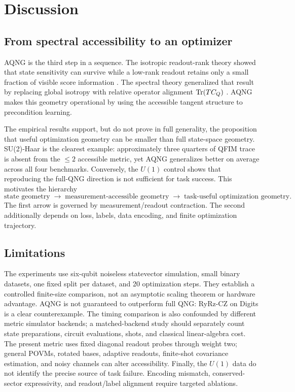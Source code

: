 \section{Discussion}
\subsection{From spectral accessibility to an optimizer}
AQNG is the third step in a sequence. The isotropic readout-rank theory showed that state sensitivity can survive while a low-rank readout retains only a small fraction of visible score information \cite{AitHaddouRank}. The spectral theory generalized that result by replacing global isotropy with relative operator alignment $\operatorname{Tr}(TC_Q)$ \cite{AitHaddouSpectral}. AQNG makes this geometry operational by using the accessible tangent structure to precondition learning.

The empirical results support, but do not prove in full generality, the proposition that useful optimization geometry can be smaller than full state-space geometry. SU(2)-Haar is the clearest example: approximately three quarters of QFIM trace is absent from the $\le2$ accessible metric, yet AQNG generalizes better on average across all four benchmarks. Conversely, the $U(1)$ control shows that reproducing the full-QNG direction is not sufficient for task success. This motivates the hierarchy
\begin{equation}
\boxed{\text{state geometry}\;\longrightarrow\;\text{measurement-accessible geometry}\;\longrightarrow\;\text{task-useful optimization geometry}.}
\end{equation}
The first arrow is governed by measurement/readout contraction. The second additionally depends on loss, labels, data encoding, and finite optimization trajectory.

\subsection{Limitations}
The experiments use six-qubit noiseless statevector simulation, small binary datasets, one fixed split per dataset, and 20 optimization steps. They establish a controlled finite-size comparison, not an asymptotic scaling theorem or hardware advantage. AQNG is not guaranteed to outperform full QNG: RyRz-CZ on Digits is a clear counterexample. The timing comparison is also confounded by different metric simulator backends; a matched-backend study should separately count state preparations, circuit evaluations, shots, and classical linear-algebra cost. The present metric uses fixed diagonal readout probes through weight two; general POVMs, rotated bases, adaptive readouts, finite-shot covariance estimation, and noisy channels can alter accessibility. Finally, the $U(1)$ data do not identify the precise source of task failure. Encoding mismatch, conserved-sector expressivity, and readout/label alignment require targeted ablations.

